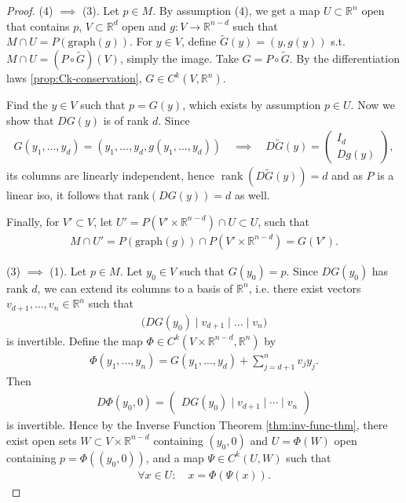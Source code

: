 \begin{proof}
	(4) $\implies$ (3). Let $p \in M$. By assumption (4), we get a map $U \subset \mathbb{R}^{n}$ open that contains $p$, $V \subset \mathbb{R}^{d}$ open and $g: V \to \mathbb{R}^{n-d}$ such that $M \cap U = P(\text{graph}(g))$. For $y \in V$, define $\tilde{G}(y) = (y, g(y))$ s.t. $M \cap U = (P \circ \tilde{G})(V)$, simply the image. Take $G = P \circ \tilde{G}$. By the differentiation laws \ref{prop:Ck-conservation}, $G \in C^{k}(V, \mathbb{R}^{n})$.

	Find the $y \in V$ such that $p = G(y)$, which exists by assumption $p \in U$. Now we show that $DG(y)$ is of rank $d$. Since
	\begin{align*}
		G(y_{1}, \dots, y_{d}) = (y_{1}, \dots, y_{d}, g(y_{1}, \dots, y_{d})) \quad  \implies \quad
		D\tilde G(y) =
		\begin{pmatrix}
			I_d \\
			Dg(y)
		\end{pmatrix},
	\end{align*}
	its columns are linearly independent, hence $\operatorname{rank}(D\tilde G(y)) = d$ and as $P$ is a linear iso, it follows that $\text{rank}(DG(y)) = d$ as well.

	Finally, for $V' \subset V$, let $U' = P(V' \times \mathbb{R}^{n-d}) \cap U \subset U$, such that
	\begin{align*}
		M \cap U' = P(\text{graph}(g)) \cap P(V' \times \mathbb{R}^{n-d}) = G(V').
	\end{align*}

	(3) $\implies$ (1). Let $p \in M$. Let $y_0 \in V$ such that $G(y_0) = p$.
	Since $DG(y_0)$ has rank $d$, we can extend its columns to a basis of $\mathbb{R}^n$, i.e.
	there exist vectors $v_{d+1}, \dots, v_n \in \mathbb{R}^n$ such that
	\begin{align*}
		\Big(DG(y_0) \mid v_{d+1} \mid \dots \mid v_n\Big)
	\end{align*}
	is invertible. Define the map $\Phi \in C^{k}(V \times \mathbb{R}^{n-d}, \mathbb{R}^{n})$ by
	\begin{align*}
		\Phi(y_{1}, \dots, y_{n})
		= G(y_{1}, \dots, y_{d}) + \sum_{j=d+1}^{n} v_{j}y_{j}.
	\end{align*}
	Then
	\begin{align*}
		D\Phi(y_0,0)
		=
		\begin{pmatrix}
			DG(y_0) \mid v_{d+1} \mid \cdots \mid  v_n
		\end{pmatrix}
	\end{align*}
	is invertible. Hence by the Inverse Function Theorem \ref{thm:inv-func-thm}, there exist
	open sets $W \subset V \times \mathbb{R}^{n-d}$ containing $(y_0,0)$ and
	$U = \Phi(W)$ open containing $p = \Phi((y_{0},0))$, and a map $\Psi \in C^{k}(U, W)$ such that
	\begin{align*}
		\forall x \in U:\quad x = \Phi(\Psi(x)).
	\end{align*}


\end{proof}
